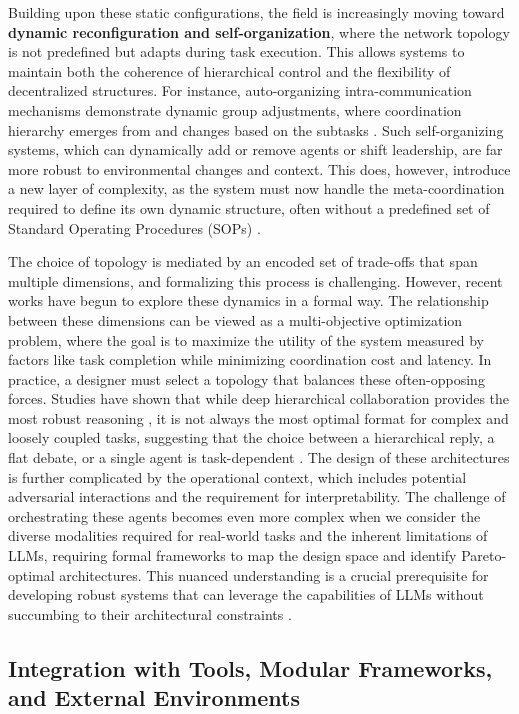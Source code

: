 \documentclass[11pt,a4paper]{article}
\begin{document}
Building upon these static configurations, the field is increasingly moving toward \textbf{dynamic reconfiguration and self-organization}, where the network topology is not predefined but adapts during task execution. This allows systems to maintain both the coherence of hierarchical control and the flexibility of decentralized structures. For instance, auto-organizing intra-communication mechanisms demonstrate dynamic group adjustments, where coordination hierarchy emerges from and changes based on the subtasks \cite{arxiv:2403.08282v2}. Such self-organizing systems, which can dynamically add or remove agents or shift leadership, are far more robust to environmental changes and context. This does, however, introduce a new layer of complexity, as the system must now handle the meta-coordination required to define its own dynamic structure, often without a predefined set of Standard Operating Procedures (SOPs) \cite{arxiv:2406.07155v1}.

The choice of topology is mediated by an encoded set of trade-offs that span multiple dimensions, and formalizing this process is challenging. However, recent works have begun to explore these dynamics in a formal way. The relationship between these dimensions can be viewed as a multi-objective optimization problem, where the goal is to maximize the utility of the system measured by factors like task completion while minimizing coordination cost and latency. In practice, a designer must select a topology that balances these often-opposing forces. Studies have shown that while deep hierarchical collaboration provides the most robust reasoning , it is not always the most optimal format for complex and loosely coupled tasks, suggesting that the choice between a hierarchical reply, a flat debate, or a single agent is task-dependent \cite{arxiv:2402.03578v1}. The design of these architectures is further complicated by the operational context, which includes potential adversarial interactions and the requirement for interpretability. The challenge of orchestrating these agents becomes even more complex when we consider the diverse modalities required for real-world tasks and the inherent limitations of LLMs, requiring formal frameworks to map the design space and identify Pareto-optimal architectures. This nuanced understanding is a crucial prerequisite for developing robust systems that can leverage the capabilities of LLMs without succumbing to their architectural constraints \cite{arxiv:2402.01108v1}.


\subsection{Integration with Tools, Modular Frameworks, and External Environments}
\end{document}
